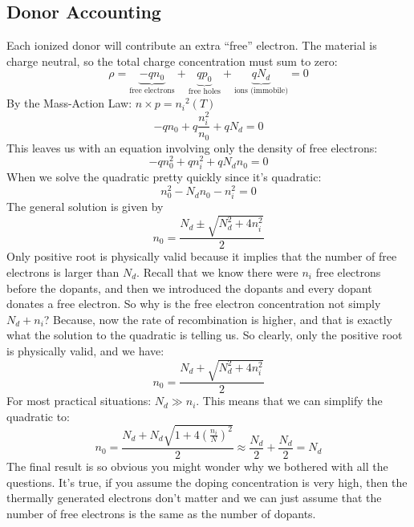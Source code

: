 \subsection{Donor Accounting}
Each ionized donor will contribute an extra “free” electron.  The material is charge neutral, so the total charge concentration must sum to zero:
    \begin{equation}
        \rho = \underbrace{- q{n_0}}_{\text{free electrons}}
        + \underbrace{q{p_0}}_{\text{free holes}}
        + \underbrace{q{N_d}}_{\text{ions (immobile)}} = 0
    \end{equation}
By the Mass-Action Law:  $n \times p = {n_i}^2(T)$
    \begin{equation}
        - q{n_0} + q\frac{{n_i^2}}{{{n_0}}} + q{N_d} = 0
    \end{equation}
This leaves us with an equation involving only the density of free electrons:
    \begin{equation}
        - qn_0^2 + qn_i^2 + q{N_d}{n_0} = 0
    \end{equation}
When we solve the quadratic pretty quickly since it’s quadratic:
    \begin{equation}
        n_0^2 - {N_d}{n_0} - n_i^2 = 0
    \end{equation}
The general solution is given by
    \begin{equation}
        {n_0} = \frac{{{N_d} \pm \sqrt {N_d^2 + 4n_i^2} }}{2}
    \end{equation}
Only positive root is physically valid because it implies that the number of free electrons is larger than $N_d$.  Recall that we know there were $n_i$ free electrons before the dopants, and then we introduced the dopants and every dopant donates a free electron.  So why is the free electron concentration not simply $N_d + n_i$?  Because, now the rate of recombination is higher, and that is exactly what the solution to the quadratic is telling us.  So clearly, only the positive root is physically valid, and we have:
    \begin{equation}
        {n_0} = \frac{{{N_d} + \sqrt {N_d^2 + 4n_i^2} }}{2}
    \end{equation}
For most practical situations:  ${N_d} \gg {n_i}$.  This means that we can simplify the quadratic to: 
    \begin{equation}
        {n_0} = \frac{{{N_d} + {N_d}\sqrt {1 + 4{{\left( {\frac{{{n_i}}}{N}} \right)}^2}} }}{2} \approx \frac{{{N_d}}}{2} + \frac{{{N_d}}}{2} = {N_d}
    \end{equation}
The final result is so obvious you might wonder why we bothered with all the questions.  It’s true, if you assume the doping concentration is very high, then the thermally generated electrons don’t matter and we can just assume that the number of free electrons is the same as the number of dopants.
